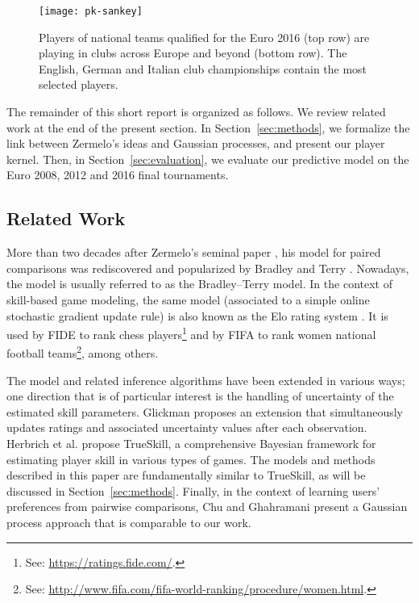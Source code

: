 \begin{figure}[t]
  \centering
  \texttt{[image: pk-sankey]}
  \caption{
  Players of national teams qualified for the Euro 2016 (top row) are playing in clubs across Europe and beyond (bottom row).
  The English, German and Italian club championships contain the most selected players.
}
  \label{fig:sankey}
  \vspace{-0.1cm}
\end{figure}

The remainder of this short report is organized as follows.
We review related work at the end of the present section.
In Section~\ref{sec:methods}, we formalize the link between Zermelo's ideas and Gaussian processes, and present our player kernel.
Then, in Section~\ref{sec:evaluation}, we evaluate our predictive model on the Euro 2008, 2012 and 2016 final tournaments.


\subsection{Related Work}

More than two decades after Zermelo's seminal paper \cite{zermelo1928berechnung}, his model for paired comparisons was rediscovered and popularized by Bradley and Terry \cite{bradley1952rank}.
Nowadays, the model is usually referred to as the Bradley--Terry model.
In the context of skill-based game modeling, the same model (associated to a simple online stochastic gradient update rule) is also known as the Elo rating system \cite{elo1978rating}.
It is used by FIDE to rank chess players\footnote{See: \url{https://ratings.fide.com/}.} and by FIFA to rank women national football teams\footnote{See: \url{http://www.fifa.com/fifa-world-ranking/procedure/women.html}.}, among others.

The model and related inference algorithms have been extended in various ways; one direction that is of particular interest is the handling of uncertainty of the estimated skill parameters.
Glickman \cite{glickman1999parameter} proposes an extension that simultaneously updates ratings and associated uncertainty values after each observation.
Herbrich et al. \cite{herbrich2006trueskill} propose TrueSkill, a comprehensive Bayesian framework for estimating player skill in various types of games.
The models and methods described in this paper are fundamentally similar to TrueSkill, as will be discussed in Section~\ref{sec:methods}.
Finally, in the context of learning users' preferences from pairwise comparisons, Chu and Ghahramani \cite{chu2005preference} present a Gaussian process approach that is comparable to our work.
